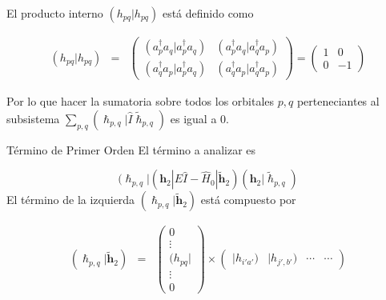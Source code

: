 \documentclass{beamer}
\begin{document}
\begin{frame}
  El producto interno $(h_{pq} | h_{pq})$ está definido como 

  \begin{eqnarray*}
    (h_{pq} | h_{pq}) &=& \begin{pmatrix}
      (a^\dagger_p a_q| a^\dagger_p a_q) &  (a^\dagger_p a_q| a^\dagger_q a_p) \\
      (a^\dagger_q a_p| a^\dagger_p a_q)  & (a^\dagger_q a_p| a^\dagger_q a_p)
    \end{pmatrix} 
    = \begin{pmatrix}
      1 &  0 \\
      0 &  -1
      \end{pmatrix}
  \end{eqnarray*}

  Por lo que hacer la sumatoria sobre todos los orbitales $p,q$ perteneciantes al subsistema  
  $\sum_{p,q} (\bm{\hslash}_{p,q} |\hat{I} \bm{\widetilde{\hslash}}_{p,q})$ es igual a 0.
  
\end{frame}

\small

\small
\begin{frame}{Término de Primer Orden}
El término a analizar es 

\begin{equation*}
  ( \bm{\hslash}_{p,q} | (\bm{h}_2| E \hat{I} - \hat{H}_0 |
	 \bm{\widetilde{h}}_2 )   (\bm{h}_2| \widetilde{\bm{\hslash}}_{p,q} )
\end{equation*}
\pause
El término de la izquierda $( \bm{\hslash}_{p,q} | \bm{\widetilde{h}}_2 )$ está compuesto por

\begin{eqnarray*}
	( \bm{\hslash}_{p,q} | \bm{\widetilde{h}}_2 ) &=& \begin{pmatrix}
		
		0 \\
		\vdots \\
		(h_{pq}| \\
		\vdots \\
		0
	\end{pmatrix}
	\times \begin{pmatrix}
		
		 |h_{i'a'}) & |h_{j',b'}) & \cdots  & \cdots
	\end{pmatrix} \end{eqnarray*}

  
\end{frame}
\end{document}
